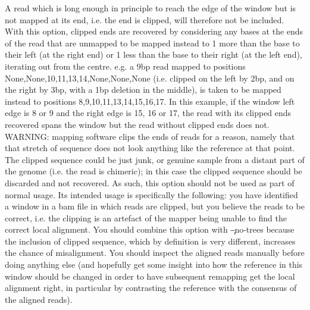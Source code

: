 \begin{itemize}
A read which is long enough in principle to reach the edge of the window but is not mapped at its end, i.e.
the end is clipped, will therefore not be included.
With this option, clipped ends are recovered by considering any bases at the ends of the read that are unmapped to be mapped instead to 1 more than the base to their left (at the right end) or 1 less than the base to their right (at the left end), iterating out from the centre.
e.g. a 9bp read mapped to positions None,None,10,11,13,14,None,None,None (i.e. clipped on the left by 2bp, and on the right by 3bp, with a 1bp deletion in the middle), is taken to be mapped instead to positions 8,9,10,11,13,14,15,16,17.
In this example, if the window left edge is 8 or 9 and the right edge is 15, 16 or 17, the read with its clipped ends recovered spans the window but the read without clipped ends does not.
WARNING: mapping software clips the ends of reads for a reason, namely that that stretch of sequence does not look anything like the reference at that point.
The clipped sequence could be just junk, or genuine sample from a distant part of the genome (i.e. the read is chimeric); in this case the clipped sequence should be discarded and not recovered.
As such, this option should not be used as part of normal \pmt usage.
Its intended usage is specifically the following: you have identified a window in a bam file in which reads are clipped, but you believe the reads to be correct, i.e. the clipping is an artefact of the mapper being unable to find the correct local alignment.
You should combine this option with \c{--no-trees} because the inclusion of clipped sequence, which by definition is very different, increases the chance of misalignment.
You should inspect the aligned reads manually before doing anything else (and hopefully get some insight into how the reference in this window should be changed in order to have subsequent remapping get the local alignment right, in particular by contrasting the reference with the consensus of the aligned reads).
\end{itemize}

